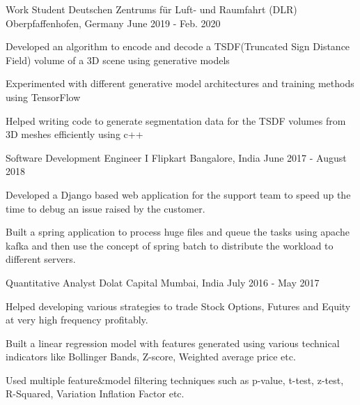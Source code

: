 
\begin{cventries}
  \cventry
    {Work Student} %
    {Deutschen Zentrums für Luft- und Raumfahrt (DLR)} %
    {Oberpfaffenhofen, Germany} %
    {June 2019 - Feb. 2020} %
    {
      \begin{cvitems} %
        \item {Developed an algorithm to encode and decode a TSDF(Truncated Sign Distance Field) volume of a 3D scene using generative models}
        \item {Experimented with different generative model architectures and training methods using TensorFlow}
        \item {Helped writing code to generate segmentation data for the TSDF volumes from 3D meshes efficiently using c++}
      \end{cvitems}
    }

  \cventry
    {Software Development Engineer I} %
    {Flipkart} %
    {Bangalore, India} %
    {June 2017 - August 2018} %
    {
      \begin{cvitems} %
        \item {Developed a Django based web application for the support team to speed up the time to debug an issue raised by the customer.}
        \item {Built a spring application to process huge files and queue the tasks using apache kafka and then use the concept of spring batch to distribute the workload to different servers.}
      \end{cvitems}
    }

  \cventry
    {Quantitative Analyst} %
    {Dolat Capital} %
    {Mumbai, India} %
    {July 2016 - May 2017} %
    {
      \begin{cvitems} %
        \item {Helped developing various strategies to trade Stock Options, Futures and Equity at very high frequency profitably.}
        \item {Built a linear regression model with features generated using various technical indicators like Bollinger Bands, Z-score, Weighted average price etc.}
        \item {Used multiple feature\&model filtering techniques such as p-value, t-test, z-test, R-Squared, Variation Inflation Factor etc.}
      \end{cvitems}
    }


\end{cventries}
